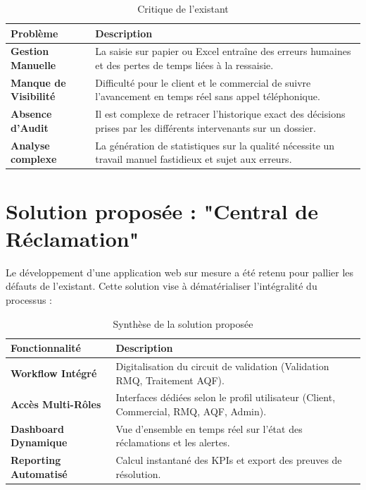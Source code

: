 \begin{table}[H]
    \centering
    \renewcommand{\arraystretch}{1.5}
    \begin{tabular}{|p{4cm}|p{10cm}|}
        \hline
        \rowcolor[HTML]{E9ECEF} 
        \textbf{Problème} & \textbf{Description} \\ \hline
        \textbf{Gestion Manuelle} & La saisie sur papier ou Excel entraîne des erreurs humaines et des pertes de temps liées à la ressaisie. \\ \hline
        \textbf{Manque de Visibilité} & Difficulté pour le client et le commercial de suivre l'avancement en temps réel sans appel téléphonique. \\ \hline
        \textbf{Absence d'Audit} & Il est complexe de retracer l'historique exact des décisions prises par les différents intervenants sur un dossier. \\ \hline
        \textbf{Analyse complexe} & La génération de statistiques sur la qualité nécessite un travail manuel fastidieux et sujet aux erreurs. \\ \hline
    \end{tabular}
    \caption{Critique de l'existant}
\end{table}

\section{Solution proposée : "Central de Réclamation"}
Le développement d'une application web sur mesure a été retenu pour pallier les défauts de l'existant. Cette solution vise à dématérialiser l'intégralité du processus :

\begin{table}[H]
    \centering
    \renewcommand{\arraystretch}{1.5}
    \begin{tabular}{|p{4cm}|p{10cm}|}
        \hline
        \rowcolor[HTML]{E9ECEF} 
        \textbf{Fonctionnalité} & \textbf{Description} \\ \hline
        \textbf{Workflow Intégré} & Digitalisation du circuit de validation (Validation RMQ, Traitement AQF). \\ \hline
        \textbf{Accès Multi-Rôles} & Interfaces dédiées selon le profil utilisateur (Client, Commercial, RMQ, AQF, Admin). \\ \hline
        \textbf{Dashboard Dynamique} & Vue d'ensemble en temps réel sur l'état des réclamations et les alertes. \\ \hline
        \textbf{Reporting Automatisé} & Calcul instantané des KPIs et export des preuves de résolution. \\ \hline
    \end{tabular}
    \caption{Synthèse de la solution proposée}
\end{table}

